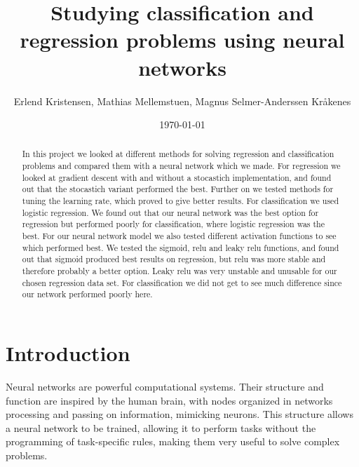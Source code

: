 \documentclass[english,notitlepage,reprint,nofootinbib]{revtex4-1}  %
\begin{document}
\title{Studying classification and regression problems using neural networks}  %
\author{Erlend Kristensen, Mathias Mellemstuen, Magnus Selmer-Anderssen Kråkenes} %
\date{\today}      


\noaffiliation                            %

\begin{abstract}
    In this project we looked at different methods for solving regression and classification problems and compared them with a neural network which we made. For regression we looked at gradient descent with and without a stocastich implementation, and found out that the stocastich variant performed the best. Further on we tested methods for tuning the learning rate, which proved to give better results. For classification we used logistic regression. We found out that our neural network was the best option for regression but performed poorly for classification, where logistic regression was the best. For our neural network model we also tested different activation functions to see which performed best. We tested the sigmoid, relu and leaky relu functions, and found out that sigmoid produced best results on regression, but relu was more stable and therefore probably a better option. Leaky relu was very unstable and unusable for our chosen regression data set. For classification we did not get to see much difference since our network performed poorly here.
\end{abstract}
\maketitle



\section{Introduction}
\label{sec:INTRODUCTION}
Neural networks are powerful computational systems. Their structure and function are inspired by the human brain, with nodes organized in networks processing and passing on information, mimicking neurons. This structure allows a neural network to be trained, allowing it to perform tasks without the programming of task-specific rules, making them very useful to solve complex problems. %
\\
\end{document}
